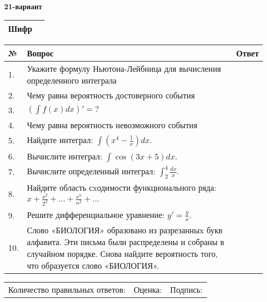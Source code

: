 \documentclass{article}
\begin{document}
  \egroup
  
  \newpage
  
  
  \textbf{21-вариант}\\
  
  \bgroup
  \def\arraystretch{1.6} %
  
  \begin{tabular}{|m{5.7cm}|m{9.5cm}|}
  \hline
  Шифр & \\
  \hline
  \end{tabular}
  
  \vspace{1cm}
  
  \begin{tabular}{|m{0.7cm}|m{10cm}|m{4cm}|}
  \hline
  № & Вопрос & Ответ \\
  \hline
  1. & Укажите формулу Ньютона-Лейбница для вычисления определенного интеграла &  \\
  \hline
  2. & Чему равна вероятность достоверного события &  \\
  \hline
  3. & \(\left( \int{f(x)dx} \right)' = ?\) &  \\
  \hline
  4. & Чему равна вероятность невозможного события &  \\
  \hline
  5. & Найдите интеграл: \(\int\left( x^{4} - \frac{1}{x} \right)dx\). &  \\
  \hline
  6. & Вычислите интеграл: \(\int{\cos(3x + 5)dx}\). &  \\
  \hline
  7. & Вычислите определенный интеграл: \(\int_{2}^{4}\frac{dx}{x}\). &  \\
  \hline
  8. & Найдите область сxодимости функционального ряда: \(x + \frac{x^{2}}{2^{2}} + ... + \frac{x^{n}}{n^{2}} + ...\) &  \\
  \hline
  9. & Решите дифференциальное уравнение: \(y' = \frac{y}{x}\). &  \\
  \hline
  10. & Слово «БИОЛОГИЯ» образовано из разрезанныx букв алфавита. Эти письма были распределены и собраны в случайном порядке. Снова найдите вероятность того, что образуется слово «БИОЛОГИЯ». &  \\
  \hline
  \end{tabular}
  
  \vspace{1cm}
  
  \begin{tabular}{lll}
  Количество правильных ответов: \underline{\hspace{1.5cm}} & 
  Оценка: \underline{\hspace{1.5cm}} & 
  Подпись: \underline{\hspace{2cm}} \\
  \end{tabular}
  
\end{document}
